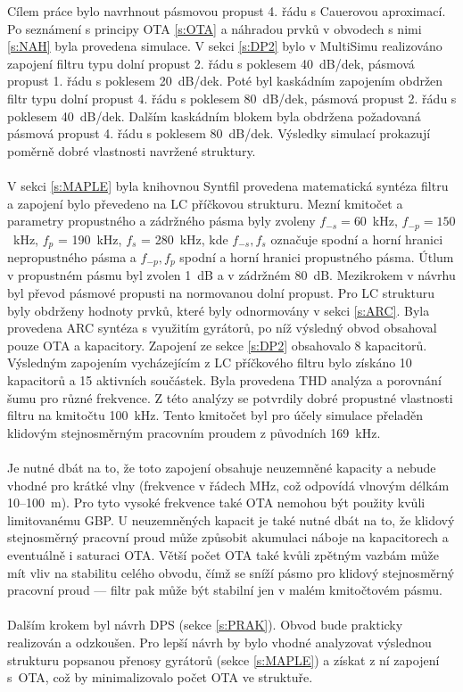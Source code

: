 \noindent Cílem práce bylo navrhnout pásmovou propust 4. řádu s Cauerovou aproximací. Po seznámení s principy OTA \ref{s:OTA} a náhradou prvků v obvodech s nimi \ref{s:NAH} byla provedena simulace. V sekci \ref{s:DP2} bylo v MultiSimu realizováno zapojení filtru typu dolní propust 2. řádu s poklesem 40~dB/dek, pásmová propust 1. řádu s poklesem 20~dB/\mbox{dek}. Poté byl kaskádním zapojením obdržen filtr typu dolní propust 4. řádu s poklesem 80~dB/dek, pásmová propust 2. řádu s poklesem 40~dB/dek. Dalším kaskádním blokem byla obdržena požadovaná pásmová propust 4. řádu s poklesem 80~dB/dek. Výsledky simulací prokazují poměrně dobré vlastnosti navržené struktury.\\
\\
V sekci \ref{s:MAPLE} byla knihovnou Syntfil provedena matematická syntéza filtru a zapojení bylo převedeno na LC příčkovou strukturu. Mezní kmitočet a parametry propustného a zádržného pásma byly zvoleny $f_{-s} = 60$~kHz, $f_{-p} = 150$~kHz, 
$f_p$ = 190~kHz, $f_s$ = 280~kHz, kde $f_{-s}, f_s$ označuje spodní a horní hranici nepropustného pásma a $f_{-p}, f_p$ spodní a horní hranici propustného pásma. Útlum v propustném pásmu byl zvolen 1~dB a v zádržném 80~dB. Mezikrokem v návrhu byl převod pásmové propusti na normovanou dolní propust. Pro LC strukturu byly obdrženy hodnoty prvků, které byly odnormovány v sekci \ref{s:ARC}. Byla provedena ARC syntéza s využitím gyrátorů, po níž výsledný obvod obsahoval pouze OTA a kapacitory. Zapojení ze sekce \ref{s:DP2} obsahovalo 8 kapacitorů. Výsledným zapojením vycházejícím z LC příčkového filtru bylo získáno 10 kapacitorů a 15 aktivních součástek. Byla provedena THD analýza a porovnání šumu pro různé frekvence. Z této analýzy se potvrdily dobré propustné vlastnosti filtru na kmitočtu 100~kHz. Tento kmitočet byl pro účely simulace přeladěn klidovým stejnosměrným pracovním proudem z původních 169~kHz. \\
\\
Je nutné dbát na to, že toto zapojení obsahuje neuzemněné kapacity a nebude vhodné pro krátké vlny (frekvence v řádech MHz, což odpovídá vlnovým délkám 10--100~m). Pro tyto vysoké frekvence také OTA nemohou být použity kvůli limitovanému GBP. U neuzemněných kapacit je také nutné dbát na to, že klidový stejnosměrný pracovní proud může způsobit akumulaci náboje na kapacitorech a eventuálně i saturaci OTA. Větší počet OTA také kvůli zpětným vazbám může mít vliv na stabilitu celého obvodu, čímž se sníží pásmo pro klidový stejnosměrný pracovní proud --- filtr pak může být stabilní jen v malém kmitočtovém pásmu.\\
\\
Dalším krokem byl návrh DPS (sekce \ref{s:PRAK}). Obvod bude prakticky realizován a odzkoušen. Pro lepší návrh by bylo vhodné analyzovat výslednou strukturu popsanou přenosy gyrátorů (sekce \ref{s:MAPLE}) a získat z ní zapojení s~OTA, což by minimalizovalo počet OTA ve struktuře.